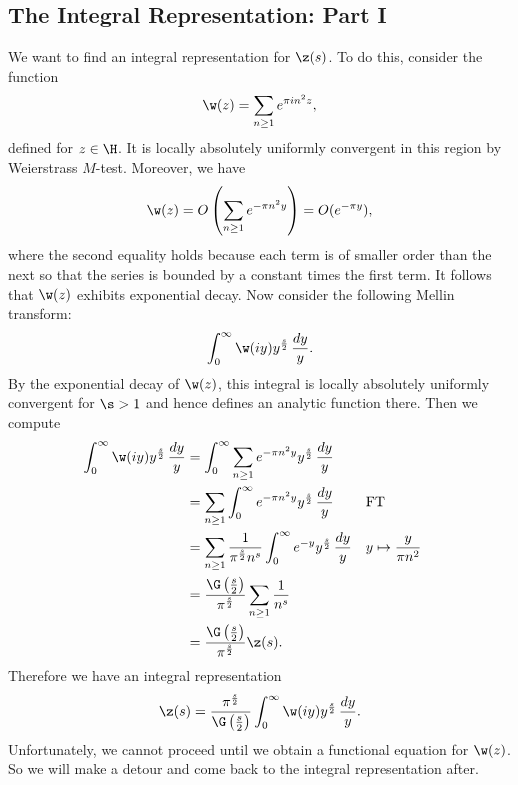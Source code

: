     \subsection*{The Integral Representation: Part I}
      We want to find an integral representation for $\z(s)$. To do this, consider the function
      \[
        \w(z) = \sum_{n \ge 1}e^{\pi in^{2}z},
      \]
      defined for $z \in \H$. It is locally absolutely uniformly convergent in this region by Weierstrass $M$-test. Moreover, we have
      \[
        \w(z) = O\left(\sum_{n \ge 1}e^{-\pi n^{2}y}\right) = O(e^{-\pi y}),
      \]
      where the second equality holds because each term is of smaller order than the next so that the series is bounded by a constant times the first term. It follows that $\w(z)$ exhibits exponential decay. Now consider the following Mellin transform:
      \[
        \int_{0}^{\infty}\w(iy)y^{\frac{s}{2}}\,\frac{dy}{y}.
      \]
      By the exponential decay of $\w(z)$, this integral is locally absolutely uniformly convergent for $\s > 1$ and hence defines an analytic function there. Then we compute
      \begin{align*}
        \int_{0}^{\infty}\w(iy)y^{\frac{s}{2}}\,\frac{dy}{y} &= \int_{0}^{\infty}\sum_{n \ge 1}e^{-\pi n^{2}y}y^{\frac{s}{2}}\,\frac{dy}{y} \\
        &= \sum_{n \ge 1}\int_{0}^{\infty}e^{-\pi n^{2}y}y^{\frac{s}{2}}\,\frac{dy}{y} && \text{FT} \\
        &= \sum_{n \ge 1}\frac{1}{\pi^{\frac{s}{2}}n^{s}}\int_{0}^{\infty}e^{-y}y^{\frac{s}{2}}\,\frac{dy}{y} && \text{$y \mapsto \frac{y}{\pi n^{2}}$} \\
        &= \frac{\G\left(\frac{s}{2}\right)}{\pi^{\frac{s}{2}}}\sum_{n \ge 1}\frac{1}{n^{s}} \\
        &= \frac{\G\left(\frac{s}{2}\right)}{\pi^{\frac{s}{2}}}\z(s).
      \end{align*}
      Therefore we have an integral representation
      \begin{equation}\label{equ:integral_representation_zeta_1}
        \z(s) = \frac{\pi^{\frac{s}{2}}}{\G\left(\frac{s}{2}\right)}\int_{0}^{\infty}\w(iy)y^{\frac{s}{2}}\,\frac{dy}{y}.
      \end{equation}
      Unfortunately, we cannot proceed until we obtain a functional equation for $\w(z)$. So we will make a detour and come back to the integral representation after.
